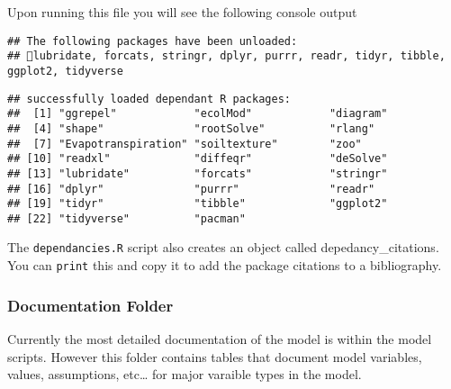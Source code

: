 \documentclass[
]{article}
\begin{document}
Upon running this file you will see the following console output

\begin{verbatim}
## The following packages have been unloaded:
## lubridate, forcats, stringr, dplyr, purrr, readr, tidyr, tibble, ggplot2, tidyverse
\end{verbatim}

\begin{verbatim}
## successfully loaded dependant R packages:
##  [1] "ggrepel"            "ecolMod"            "diagram"           
##  [4] "shape"              "rootSolve"          "rlang"             
##  [7] "Evapotranspiration" "soiltexture"        "zoo"               
## [10] "readxl"             "diffeqr"            "deSolve"           
## [13] "lubridate"          "forcats"            "stringr"           
## [16] "dplyr"              "purrr"              "readr"             
## [19] "tidyr"              "tibble"             "ggplot2"           
## [22] "tidyverse"          "pacman"
\end{verbatim}

The \texttt{dependancies.R} script also creates an object called
depedancy\_citations. You can \texttt{print} this and copy it to add the
package citations to a bibliography.

\hypertarget{documentation-folder}{%
\subsubsection{Documentation Folder}\label{documentation-folder}}

Currently the most detailed documentation of the model is within the
model scripts. However this folder contains tables that document model
variables, values, assumptions, etc\ldots{} for major varaible types in
the model.
\end{document}
